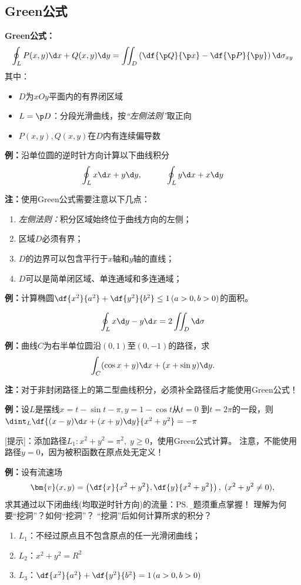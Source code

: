 \subsection{Green公式}

\begin{thx}
	{\bf Green公式：}
	$$\oint_LP(x,y)\d x+Q(x,y)\d y=\iint_D\left(
	\df{\p Q}{\p x}-\df{\p P}{\p y}\right)\d\sigma_{xy}$$
	其中：
	\begin{itemize}
	  \item $D$为$xOy$平面内的有界闭区域
	  \item $L=\p D$：分段光滑曲线，按{\it “左侧法则”}取正向
	  \item $P(x,y),Q(x,y)$在$D$内有连续偏导数
	\end{itemize}
\end{thx}

{\bf 例：}沿单位圆的逆时针方向计算以下曲线积分
$$\oint_Lx\d x+y\d y,\hspace{3em}\oint_Ly\d x+x\d y$$

{\bf 注：}使用Green公式需要注意以下几点：
\begin{enumerate}[(1)]
  \setlength{\itemindent}{1cm}
  \item {\it 左侧法则：}积分区域始终位于曲线方向的左侧；
  \item 区域$D$必须有界；
  \item $D$的边界可以包含平行于$x$轴和$y$轴的直线；
  \item $D$可以是简单闭区域、单连通域和多连通域；
\end{enumerate}

{\bf 例：}计算椭圆$\df{x^2}{a^2}+\df{y^2}{b^2}\leq 1\,(a>0,b>0)$的面积。

$$\oint_L x\d y-y\d x=2\iint_D\d\sigma$$

{\bf 例：}曲线$C$为右半单位圆沿$(0,1)$至$(0,-1)$的路径，求
$$\int_C(\cos x+y)\d x+(x+\sin y)\d y.$$

{\bf 注：}对于非封闭路径上的第二型曲线积分，必须补全路径后才能使用Green公式！

{\bf 例：}设$L$是摆线$x=t-\sin t-\pi,y=1-\cos t$从$t=0$
到$t=2\pi$的一段，则$\dint_L\df{(x-y)\d x+(x+y)\d y}{x^2+y^2}=-\pi$

[提示]：添加路径$L_1:x^2+y^2=\pi^2,\;y\geq 0$，使用Green公式计算。
注意，不能使用路径$y=0$，因为被积函数在原点处无定义！

{\bf 例：}设有流速场
$$\bm{v}(x,y)=\left(\df{x}{x^2+y^2},
\df{y}{x^2+y^2}\right),\;(x^2+y^2\ne 0),$$
求其通过以下闭曲线(均取逆时针方向)的流量：\ps{{\b 本题须重点掌握！}
理解为何要“挖洞”？如何“挖洞”？
“挖洞”后如何计算所求的积分？}
\begin{enumerate}[(1)]
  \setlength{\itemindent}{1cm}
  \item $L_1$：不经过原点且不包含原点的任一光滑闭曲线；
  \item $L_2$：$x^2+y^2=R^2$
  \item $L_3$：$\df{x^2}{a^2}+\df{y^2}{b^2}=1\,(a>0,b>0)$
\end{enumerate}

